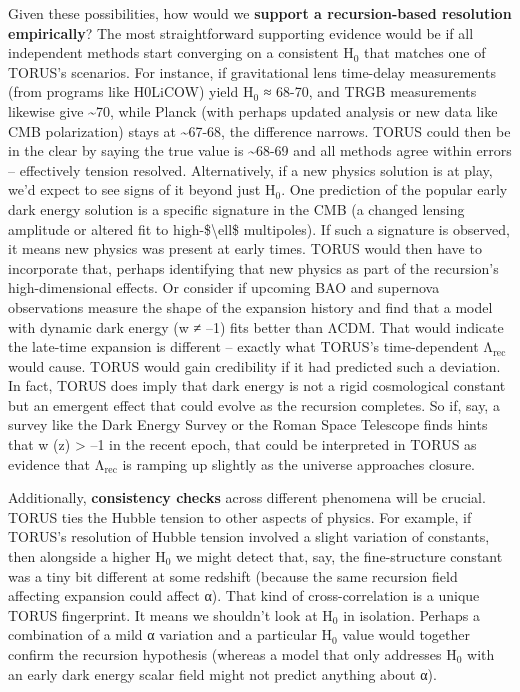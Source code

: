 \documentclass[]{article}
\newcommand{\subscript}[1]{\ensuremath{_{\mathrm{#1}}}}
\begin{document}
Given these possibilities, how would we \textbf{support a
recursion-based resolution empirically}? The most straightforward
supporting evidence would be if all independent methods start converging
on a consistent
H\subscript{0} that matches
one of TORUS's scenarios. For instance, if gravitational lens time-delay
measurements (from programs like H0LiCOW) yield
H\subscript{0} ≈ 68-70, and
TRGB measurements likewise give \textasciitilde{}70, while Planck (with
perhaps updated analysis or new data like CMB polarization) stays at
\textasciitilde{}67-68, the difference narrows. TORUS could then be in
the clear by saying the true value is \textasciitilde{}68-69 and all
methods agree within errors -- effectively tension resolved.
Alternatively, if a new physics solution is at play, we'd expect to see
signs of it beyond just
H\subscript{0}. One
prediction of the popular early dark energy solution is a specific
signature in the CMB (a changed lensing amplitude or altered fit to
high-\$\textbackslash{}ell\$ multipoles). If such a signature is
observed, it means new physics was present at early times. TORUS would
then have to incorporate that, perhaps identifying that new physics as
part of the recursion's high-dimensional effects. Or consider if
upcoming BAO and supernova observations measure the shape of the
expansion history and find that a model with dynamic dark energy (w ≠
--1) fits better than ΛCDM. That would indicate the late-time expansion
is different -- exactly what TORUS's time-dependent
Λ\subscript{rec} would
cause. TORUS would gain credibility if it had predicted such a
deviation. In fact, TORUS does imply that dark energy is not a rigid
cosmological constant but an emergent effect that could evolve as the
recursion completes​. So if, say, a survey like the Dark Energy Survey
or the Roman Space Telescope finds hints that w (z) \textgreater{} --1
in the recent epoch, that could be interpreted in TORUS as evidence that
Λ\subscript{rec} is
ramping up slightly as the universe approaches closure.

Additionally, \textbf{consistency checks} across different phenomena
will be crucial. TORUS ties the Hubble tension to other aspects of
physics. For example, if TORUS's resolution of Hubble tension involved a
slight variation of constants, then alongside a higher
H\subscript{0} we might
detect that, say, the fine-structure constant was a tiny bit different
at some redshift (because the same recursion field affecting expansion
could affect α). That kind of cross-correlation is a unique TORUS
fingerprint. It means we shouldn't look at
H\subscript{0} in
isolation. Perhaps a combination of a mild α variation and a particular
H\subscript{0} value would
together confirm the recursion hypothesis (whereas a model that only
addresses H\subscript{0}
with an early dark energy scalar field might not predict anything about
α).
\end{document}
